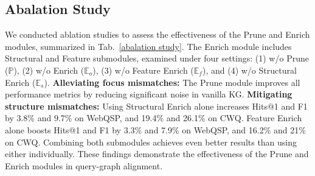 \documentclass[11pt]{article}
\begin{document}
\subsection{Abalation Study}
\begin{table}[]
\centering
{}
\caption{Ablation study of EoG's core modules, comparing the results after removing the Enrich and Prune modules separately.}
\label{abalation study}
\end{table}

We conducted ablation studies to assess the effectiveness of the Prune and Enrich modules, summarized in Tab.~\ref{abalation study}. The Enrich module includes Structural and Feature submodules, examined under four settings: (1) w/o Prune ($\mathds{P}$), (2) w/o Enrich ($\mathds{E}_o$), (3) w/o Feature Enrich ($\mathds{E}_f$), and (4) w/o Structural Enrich ($\mathds{E}_s$).
\textbf{Alleviating focus mismatches:} The Prune module improves all performance metrics by reducing significant noise in vanilla KG.
\textbf{Mitigating structure mismatches:} 
Using Structural Enrich alone increases Hits@1 and F1 by 3.8\% and 9.7\% on WebQSP, and 19.4\% and 26.1\% on CWQ. Feature Enrich alone boosts Hits@1 and F1 by 3.3\% and 7.9\% on WebQSP, and 16.2\% and 21\% on CWQ. Combining both submodules achieves even better results than using either individually.
These findings demonstrate the effectiveness of the Prune and Enrich modules in query-graph alignment.
\end{document}
